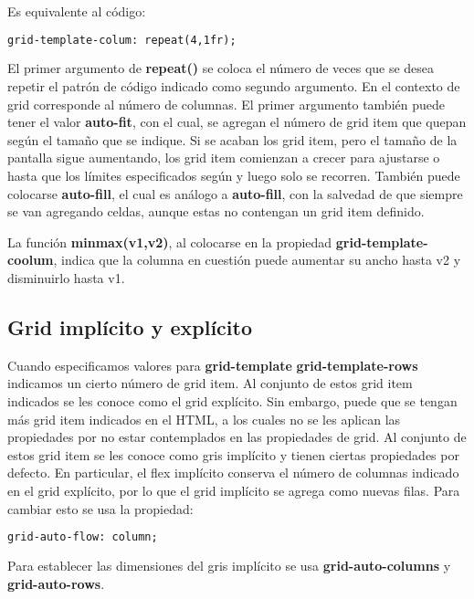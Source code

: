 \documentclass[10pt,oneside]{article}
\begin{document}
\begin{multicols}{2}
    Es equivalente al código:

    \begin{lstlisting}[language=HTML]
grid-template-colum: repeat(4,1fr);
    \end{lstlisting}
    
    El primer argumento de \textbf{repeat()} se coloca el número de veces que se desea repetir el patrón de código indicado como segundo argumento. En el contexto de grid corresponde al número de columnas.  El primer argumento también puede tener el valor \textbf{auto-fit}, con el cual, se agregan el número de grid item que quepan según el tamaño que se indique. Si se acaban los grid item, pero el tamaño de la pantalla sigue aumentando, los grid item comienzan a crecer para ajustarse o hasta que los límites especificados según y luego solo se recorren. También puede colocarse \textbf{auto-fill}, el cual es análogo a \textbf{auto-fill}, con la salvedad de que siempre se van agregando celdas, aunque estas no contengan un grid item definido. 

    La función \textbf{minmax(v1,v2)}, al colocarse en la propiedad \textbf{grid-template-coolum}, indica que la columna en cuestión puede aumentar su ancho hasta v2 y disminuirlo hasta v1. 
     
 \subsection{Grid implícito y explícito}

    Cuando especificamos valores para \textbf{grid-template} \textbf{grid-template-rows} indicamos un cierto número de grid item. Al conjunto  de estos grid item indicados se les conoce como el grid explícito. Sin embargo, puede que se tengan más grid item indicados en el HTML, a los cuales no se les aplican las propiedades por no estar contemplados en las propiedades de grid. Al conjunto de estos grid item se les conoce como gris implícito y tienen ciertas propiedades por defecto. En particular, el flex implícito conserva el número de columnas indicado en el grid explícito, por lo que el grid implícito se agrega como nuevas filas. Para cambiar esto se usa la propiedad:

    \begin{lstlisting}[language=HTML]
grid-auto-flow: column;       
    \end{lstlisting}

    Para establecer las dimensiones del gris implícito se usa \textbf{grid-auto-columns} y \textbf{grid-auto-rows}.


\end{multicols}
\end{document}
